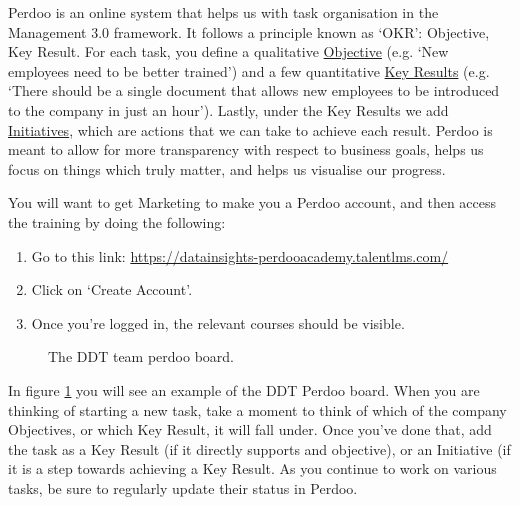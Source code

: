 \documentclass[11pt]{report}
\begin{document}
Perdoo is an online system that helps us with task organisation in the Management 3.0 framework. It follows a principle known as `OKR': Objective, Key Result. For each task, you define a qualitative \underline{Objective} (e.g. `New employees need to be better trained') and a few quantitative \underline{Key Results} (e.g. `There should be a single document that allows new employees to be introduced to the company in just an hour'). Lastly, under the Key Results we add \underline{Initiatives}, which are actions that we can take to achieve each result. Perdoo is meant to allow for more transparency with respect to business goals, helps us focus on things which truly matter, and helps us visualise our progress.

You will want to get Marketing to make you a Perdoo account, and then access the training by doing the following:
\begin{enumerate}
\item Go to this link: \href{https://datainsights-perdooacademy.talentlms.com/}{https://datainsights-perdooacademy.talentlms.com/}
\item Click on `Create Account'.
\item Once you're logged in, the relevant courses should be visible.
\end{enumerate}

\begin{figure}[!htb]
       \caption{\label{fig:perdoo} The DDT team perdoo board.}
\end{figure}

In figure \ref{fig:perdoo} you will see an example of the DDT Perdoo board. When you are thinking of starting a new task, take a moment to think of which of the company Objectives, or which Key Result, it will fall under. Once you've done that, add the task as a Key Result (if it directly supports and objective), or an Initiative (if it is a step towards achieving a Key Result. As you continue to work on various tasks, be sure to regularly update their status in Perdoo.
\end{document}
